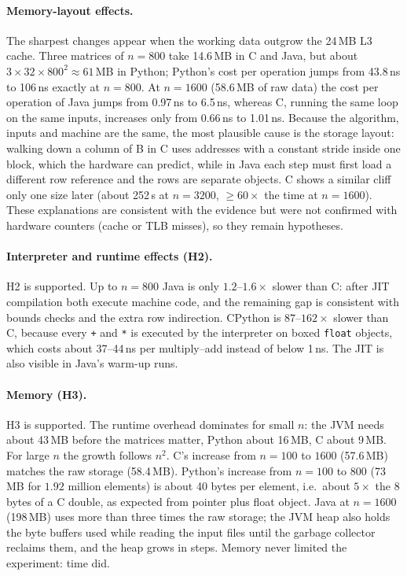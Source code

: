 \documentclass[11pt,a4paper]{article}
\begin{document}
\paragraph{Memory-layout effects.} The sharpest changes appear when the working data
outgrow the 24\,MB L3 cache. Three matrices of $n = 800$ take 14.6\,MB in C and Java, but
about $3 \times 32 \times 800^2 \approx 61$\,MB in Python; Python's cost per operation jumps
from 43.8\,ns to 106\,ns exactly at $n = 800$. At $n = 1600$ (58.6\,MB of raw data) the cost
per operation of Java jumps from 0.97\,ns to 6.5\,ns, whereas C, running the same loop on
the same inputs, increases only from 0.66\,ns to 1.01\,ns. Because the algorithm, inputs and
machine are the same, the most plausible cause is the storage layout: walking down a column
of B in C uses addresses with a constant stride inside one block, which the hardware can
predict, while in Java each step must first load a different row reference and the rows
are separate objects. C shows a similar cliff only one size later (about 252\,s at
$n = 3200$, $\geq 60\times$ the time at $n = 1600$). These explanations are consistent with
the evidence but were not confirmed with hardware counters (cache or TLB misses), so they
remain hypotheses.

\paragraph{Interpreter and runtime effects (H2).} H2 is supported. Up to $n = 800$ Java
is only $1.2$--$1.6\times$ slower than C: after JIT compilation both execute machine code,
and the remaining gap is consistent with bounds checks and the extra row indirection.
CPython is $87$--$162\times$ slower than C, because every \texttt{+} and \texttt{*} is
executed by the interpreter on boxed \texttt{float} objects, which costs about 37--44\,ns per
multiply--add instead of below 1\,ns. The JIT is also visible in Java's warm-up runs.

\paragraph{Memory (H3).} H3 is supported. The runtime overhead dominates for small $n$:
the JVM needs about 43\,MB before the matrices matter, Python about 16\,MB, C about 9\,MB.
For large $n$ the growth follows $n^2$. C's increase from $n=100$ to $1600$ (57.6\,MB)
matches the raw storage (58.4\,MB). Python's increase from $n=100$ to $800$ (73\,MB for
$1.92$ million elements) is about 40 bytes per element, i.e.\ about $5\times$ the 8 bytes
of a C double, as expected from pointer plus float object. Java at $n = 1600$ (198\,MB)
uses more than three times the raw storage; the JVM heap also holds the byte buffers used
while reading the input files until the garbage collector reclaims them, and the heap
grows in steps. Memory never limited the experiment: time did.
\end{document}
